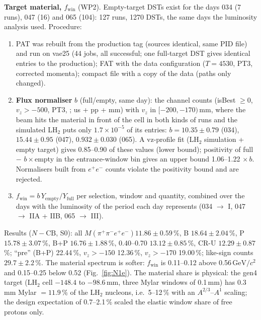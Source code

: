 \documentclass[11pt,a4paper]{article}
\newcommand{\ee}{\ensuremath{e^{+}e^{-}}\xspace}
\newcommand{\Mfour}{\ensuremath{M(\pi^{+}\pi^{-}e^{+}e^{-})}\xspace}
\newcommand{\GeVcc}{\ensuremath{\mathrm{GeV}/c^{2}}\xspace}
\newcommand{\code}[1]{\texttt{\detokenize{#1}}}
\newcommand{\vz}{\ensuremath{v_z}\xspace}
\newcommand{\fwin}{\ensuremath{f_{\mathrm{win}}}\xspace}
\begin{document}
\textbf{Target material, \fwin} (WP2). Empty-target DSTs exist for the days 034 (7 runs), 047 (16) and 065 (104): 127 runs, 1270 DSTs,
the same days the luminosity analysis used. Procedure:
\begin{enumerate}\setlength{\itemsep}{0pt}
\item PAT was rebuilt from the production tag (sources identical, same PID file) and run on vae25 (44 jobs, all successful; one
      full-target DST gives identical entries to the production); FAT with the data configuration ($T=4530$, PT3, corrected momenta); compact
      file with a copy of the data \code{scan_prepare.C} (paths only changed).
\item \textbf{Flux normaliser} $b$ (full/empty, same day): the channel counts (isBest $\ge0$, $\vz>-500$, PT3, \code{cor_ok}; us + pp + mm) with
      \vz in $[-200,-170)$\,mm, where the beam hits the material in front of the cell in both kinds of runs and the simulated LH$_2$ puts only
      $1.7\times10^{-5}$ of its entries: $b=10.35\pm0.79$ (034), $15.44\pm0.95$ (047), $0.932\pm0.030$ (065). A vz-profile fit (LH$_2$ simulation +
      empty target) gives 0.85--0.90 of these values (lower bound); positivity of full $-$ $b\times$empty in the entrance-window bin gives an upper
      bound 1.06--1.22 $\times\,b$. Normalisers built from \ee counts violate the positivity bound and are rejected.
\item $\fwin=b\,Y_{\mathrm{empty}}/Y_{\mathrm{full}}$ per selection, window and quantity, combined over the days with the luminosity of the
      period each day represents (034 $\to$ I, 047 $\to$ IIA + IIB, 065 $\to$ III).
\end{enumerate}
Results ($N-\mathrm{CB}$, S0): all \Mfour $11.86\pm0.59$\,\%, B $18.64\pm2.04$\,\%, P $15.78\pm3.07$\,\%, B+P $16.76\pm1.88$\,\%, 0.40--0.70
$13.12\pm0.85$\,\%, CR-U $12.29\pm0.87$\,\%; ``pre'' (B+P) 22.44\,\%, $\vz>-150$ 12.36\,\%, $\vz>-170$ 19.00\,\%; like-sign counts $29.7\pm2.2$\,\%.
The material spectrum is softer: \fwin is 0.11--0.12 above 0.56\,\GeVcc and 0.15--0.25 below 0.52 (Fig.~\ref{fig:N1e}). The material share
is physical: the gen4 target (LH$_2$ cell $-148.4$ to $-98.6$\,mm, three Mylar windows of 0.1\,mm) has 0.3\,mm Mylar $=11.9$\,\% of the LH$_2$
nucleons, i.e.\ 5--12\,\% with an $A^{2/3}$--$A^1$ scaling; the design expectation of 0.7--2.1\,\% scaled the elastic window share of free
protons only.
\end{document}
